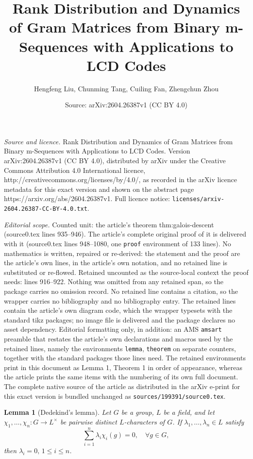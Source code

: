 \documentclass[10pt,a4paper]{amsart}
\title{Rank Distribution and Dynamics of Gram Matrices from Binary m-Sequences with Applications to LCD Codes}
\author{Hengfeng Liu, Chunming Tang, Cuiling Fan, Zhengchun Zhou}
\date{Source: arXiv:2604.26387v1 (CC BY 4.0)}
\newtheorem{lemma}{Lemma}
\begin{document}
\maketitle

\noindent\emph{Source and licence.} Rank Distribution and Dynamics of Gram Matrices from Binary m-Sequences with Applications to LCD Codes. Version arXiv:2604.26387v1 (CC BY 4.0), distributed by arXiv under the Creative Commons Attribution 4.0 International licence, http://creativecommons.org/licenses/by/4.0/, as recorded in the arXiv licence metadata for this exact version and shown on the abstract page https://arxiv.org/abs/2604.26387v1. Full licence notice: \texttt{licenses/arxiv-2604.26387-CC-BY-4.0.txt}.\par\smallskip

\noindent\textit{Editorial scope.} Counted unit: the article's theorem thm:galois-descent (source0.tex lines 935--946). The article's complete original proof of it is delivered with it (source0.tex lines 948--1080, one \texttt{proof} environment of 133 lines). No mathematics is written, repaired or re-derived: the statement and the proof are the article's own lines, in the article's own notation, and no retained line is substituted or re-flowed.  Retained uncounted as the source-local context the proof needs: lines 916--922.  Nothing was omitted from any retained span, so the package carries no omission record.  No retained line contains a citation, so the wrapper carries no bibliography and no bibliography entry.  The retained lines contain the article's own diagram code, which the wrapper typesets with the standard tikz packages; no image file is delivered and the package declares no asset dependency.  Editorial formatting only, in addition: an AMS \texttt{amsart} preamble that restates the article's own declarations and macros used by the retained lines, namely the environments \texttt{lemma}, \texttt{theorem} on separate counters, together with the standard packages those lines need.  The retained environments print in this document as Lemma 1, Theorem 1 in order of appearance, whereas the article prints the same items with the numbering of its own full document.  The complete native source of the article as distributed in the arXiv e-print for this exact version is bundled unchanged as \texttt{sources/199391/source0.tex}.
\begin{lemma}[Dedekind's lemma]\label{lem:dedekind}
	Let $G$ be a group, $L$ be a field, and let $\chi_1, \dots, \chi_n : G \to L^{\times}$ be pairwise distinct $L$-characters of $G$. If $\lambda_1, \dots, \lambda_n \in L$ satisfy
	$$
	\sum_{i=1}^{n}\lambda_i \chi_i(g) = 0, \quad \forall  g \in G,
	$$
	then $\lambda_i =0, \, 1\le i\le n$.
\end{lemma}
\end{document}
